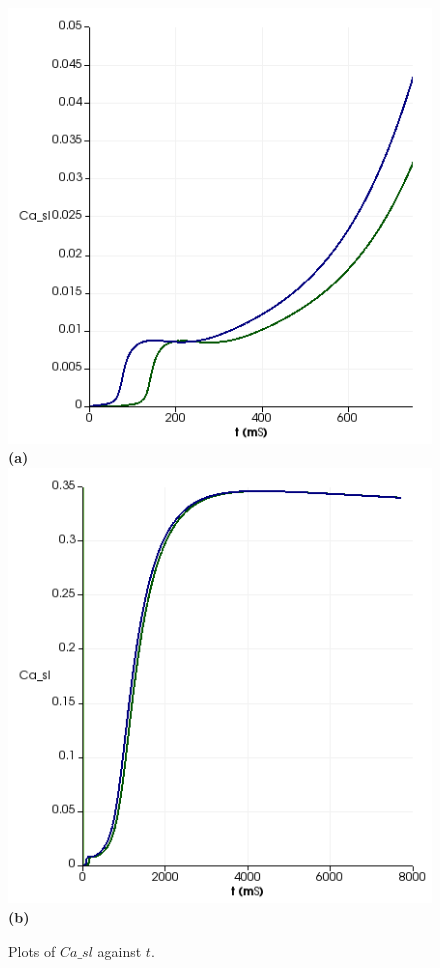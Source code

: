 \documentclass[12pt,a4paper]{article}
\begin{document}
\begin{figure}

 \includegraphics[width=0.7\linewidth]{Casl700}  \textbf{(a)}
   \includegraphics[width=0.7\linewidth]{Casl8000} \textbf{(b)}
    \caption{Plots of $Ca\_sl$ against $t$.}
    \label{fig:4}
\end{figure}
\end{document}
